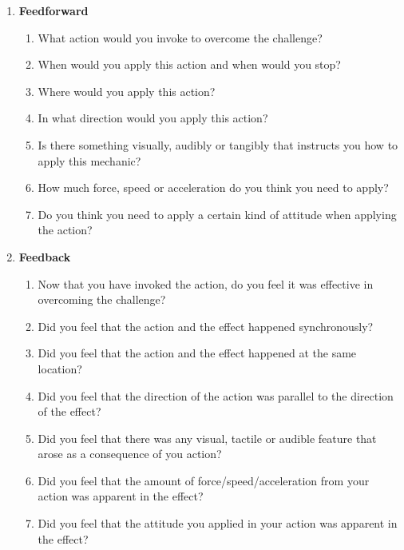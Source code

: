 \begin{enumerate}
  \item \textbf{Feedforward}
  \begin{enumerate}
    \item What action would you invoke to overcome the challenge?
    \item When would you apply this action and when would you stop?
    \item Where would you apply this action?
    \item In what direction would you apply this action?
    \item Is there something visually, audibly or tangibly that instructs you how to apply this mechanic?
    \item How much force, speed or acceleration do you think you need to apply?
    \item Do you think you need to apply a certain kind of attitude when applying the action?
  \end{enumerate}
  \item \textbf{Feedback}
  \begin{enumerate}
    \item Now that you have invoked the action, do you feel it was effective in overcoming the challenge?
    \item Did you feel that the action and the effect happened synchronously?
    \item Did you feel that the action and the effect happened at the same location?
    \item Did you feel that the direction of the action was parallel to the direction of the effect?
    \item Did you feel that there was any visual, tactile or audible feature that arose as a consequence of you action?
    \item Did you feel that the amount of force/speed/acceleration from your action was apparent in the effect?
    \item Did you feel that the attitude you applied in your action was apparent in the effect?
  \end{enumerate}
\end{enumerate}

